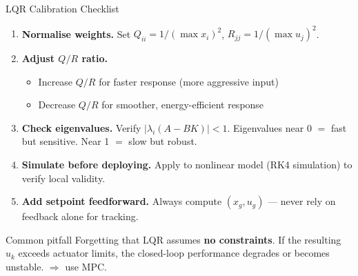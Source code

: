 \documentclass[aspectratio=169,11pt]{beamer}
\begin{document}
\begin{frame}[shrink=5]{LQR Calibration Checklist}

\begin{enumerate}
  \item \textbf{Normalise weights.}
    Set $Q_{ii} = 1/(\max x_i)^2$, $R_{jj} = 1/(\max u_j)^2$.

  \item \textbf{Adjust $Q/R$ ratio.}
    \begin{itemize}
      \item Increase $Q/R$ for faster response (more aggressive input)
      \item Decrease $Q/R$ for smoother, energy-efficient response
    \end{itemize}

  \item \textbf{Check eigenvalues.}
    Verify $|\lambda_i(A - BK)| < 1$.  Eigenvalues near 0 $=$ fast but sensitive.  Near 1 $=$ slow but robust.

  \item \textbf{Simulate before deploying.}
    Apply to nonlinear model (RK4 simulation) to verify local validity.

  \item \textbf{Add setpoint feedforward.}
    Always compute $(x_g, u_g)$ --- never rely on feedback alone for tracking.
\end{enumerate}

\begin{alertblock}{Common pitfall}
Forgetting that LQR assumes \textbf{no constraints}. If the resulting $u_k$ exceeds actuator limits, the closed-loop performance degrades or becomes unstable. $\Rightarrow$ use MPC.
\end{alertblock}
\end{frame}
\end{document}
